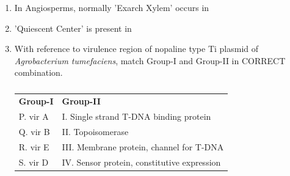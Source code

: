 \documentclass[journal,12pt,onecolumn]{IEEEtran}
\theoremstyle{remark}
\begin{document}
\begin{enumerate}
    \hfill{}

    \item In Angiosperms, normally 'Exarch Xylem' occurs in

    \hfill{}
    \begin{enumerate}
    \end{enumerate}

    \item 'Quiescent Center' is present in

    \hfill{}
    \begin{enumerate}
    \end{enumerate}

    \item With reference to virulence  region of nopaline type Ti plasmid of \textit{Agrobacterium tumefaciens}, match Group-I  and Group-II  in CORRECT combination.
    \begin{table}[h!]
    \centering
    \caption*{}
    \label{tab:q49}
    \begin{tabular}{ll}
        \textbf{Group-I} & \textbf{Group-II} \\
        P. vir A & I. Single strand T-DNA binding protein \\
        Q. vir B & II. Topoisomerase \\
        R. vir E & III. Membrane protein, channel for T-DNA \\
        S. vir D & IV. Sensor protein, constitutive expression \\
    \end{tabular}
    \end{table}


\end{enumerate}
\end{document}
